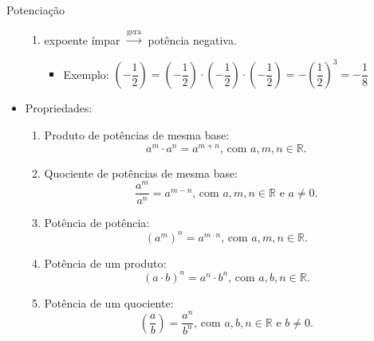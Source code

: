 \documentclass[14pt, aspectratio=169]{beamer}
\newcommand{\R}{\mathbb{R}}
\newcommand{\skipframe}{\vspace{10.0cm}}
\begin{document}
\begin{frame}[allowframebreaks]{Potenciação}
\begin{itemize}
\begin{enumerate}[a]
        \item expoente ímpar $\xrightarrow{\text{gera}}$ potência negativa.

        \begin{itemize}
            \item Exemplo: $\left( -\dfrac{1}{2} \right) = \left( -\dfrac{1}{2} \right) \cdot \left( -\dfrac{1}{2} \right) \cdot \left( -\dfrac{1}{2} \right) = - \left(\dfrac{1}{2} \right)^3 = - \dfrac{1}{8}$
        \end{itemize}
    \end{enumerate}

    \skipframe

    \item Propriedades:

    \begin{enumerate}[a]
        \item Produto de potências de mesma base:
            \begin{equation*}
                a^m \cdot a^n = a^{m + n} \text{, com } a,m,n \in \R.
            \end{equation*}
            
        \item Quociente de potências de mesma base:
        \begin{equation*}
        \label{p2}
            \dfrac{a^m}{a^n} = a^{m - n} \text{, com } a,m,n \in \R \text{ e } a \neq 0. 
        \end{equation*}

        \skipframe

        \item Potência de potência:
        \begin{equation*}
            \left( a^m \right)^n = a^{m \cdot n} \text{, com } a,m,n \in \R.
        \end{equation*}

        \item Potência de um produto:
        \begin{equation*}
            \left( a \cdot b \right)^n = a^n \cdot b^n \text{, com } a,b,n \in \R.
        \end{equation*}

        \skipframe

        \item Potência de um quociente:
        \begin{equation*}
            \left( \dfrac{a}{b} \right) = \dfrac{a^n}{b^n} \text{, com } a,b,n \in \R \text{ e } b \neq 0.
        \end{equation*}


\end{enumerate}
\end{itemize}
\end{frame}
\end{document}
